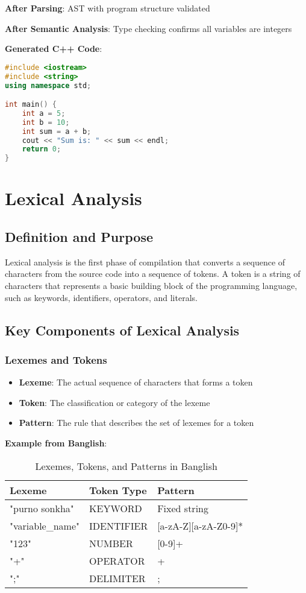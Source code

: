 \documentclass[12pt,a4paper]{article}
\begin{document}
\textbf{After Parsing}: AST with program structure validated

\textbf{After Semantic Analysis}: Type checking confirms all variables are integers

\textbf{Generated C++ Code}:
\begin{lstlisting}[language=C++, caption=Generated C++ Output]
#include <iostream>
#include <string>
using namespace std;

int main() {
    int a = 5;
    int b = 10;
    int sum = a + b;
    cout << "Sum is: " << sum << endl;
    return 0;
}
\end{lstlisting}

\section{Lexical Analysis}

\subsection{Definition and Purpose}

Lexical analysis is the first phase of compilation that converts a sequence of characters from the source code into a sequence of tokens. A token is a string of characters that represents a basic building block of the programming language, such as keywords, identifiers, operators, and literals.

\subsection{Key Components of Lexical Analysis}

\subsubsection{Lexemes and Tokens}

\begin{itemize}
    \item \textbf{Lexeme}: The actual sequence of characters that forms a token
    \item \textbf{Token}: The classification or category of the lexeme
    \item \textbf{Pattern}: The rule that describes the set of lexemes for a token
\end{itemize}

\textbf{Example from Banglish}:
\begin{table}[H]
\centering
\begin{tabular}{|l|l|l|}
\hline
\textbf{Lexeme} & \textbf{Token Type} & \textbf{Pattern} \\
\hline
"purno sonkha" & KEYWORD & Fixed string \\
"variable\_name" & IDENTIFIER & [a-zA-Z][a-zA-Z0-9]* \\
"123" & NUMBER & [0-9]+ \\
"+" & OPERATOR & + \\
";" & DELIMITER & ; \\
\hline
\end{tabular}
\caption{Lexemes, Tokens, and Patterns in Banglish}
\end{table}
\end{document}
